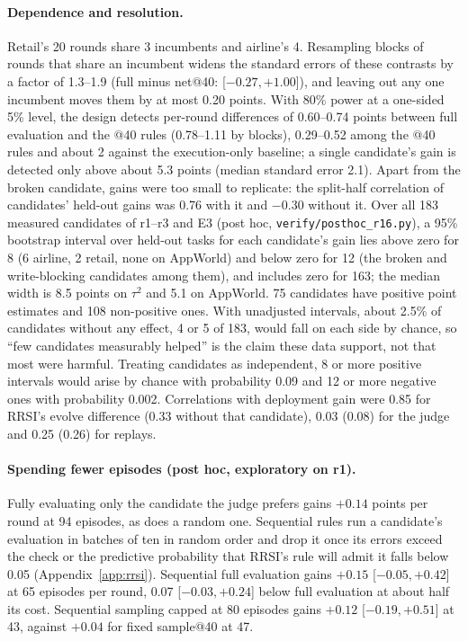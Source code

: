 \documentclass[11pt]{article}
\begin{document}
\paragraph{Dependence and resolution.} Retail's 20 rounds share 3 incumbents and airline's 4. Resampling blocks of rounds that share an incumbent widens the standard errors of these contrasts by a factor of 1.3--1.9 (full minus net@40: [$-0.27,+1.00$]), and leaving out any one incumbent moves them by at most 0.20 points. With 80\% power at a one-sided 5\% level, the design detects per-round differences of 0.60--0.74 points between full evaluation and the @40 rules (0.78--1.11 by blocks), 0.29--0.52 among the @40 rules and about 2 against the execution-only baseline; a single candidate's gain is detected only above about 5.3 points (median standard error 2.1). Apart from the broken candidate, gains were too small to replicate: the split-half correlation of candidates' held-out gains was 0.76 with it and $-0.30$ without it. Over all 183 measured candidates of r1--r3 and E3 (post hoc, \texttt{verify/posthoc\_r16.py}), a 95\% bootstrap interval over held-out tasks for each candidate's gain lies above zero for 8 (6 airline, 2 retail, none on AppWorld) and below zero for 12 (the broken and write-blocking candidates among them), and includes zero for 163; the median width is 8.5 points on $\tau^2$ and 5.1 on AppWorld. 75 candidates have positive point estimates and 108 non-positive ones. With unadjusted intervals, about 2.5\% of candidates without any effect, 4 or 5 of 183, would fall on each side by chance, so ``few candidates measurably helped'' is the claim these data support, not that most were harmful. Treating candidates as independent, 8 or more positive intervals would arise by chance with probability 0.09 and 12 or more negative ones with probability 0.002. Correlations with deployment gain were 0.85 for RRSI's evolve difference (0.33 without that candidate), 0.03 (0.08) for the judge and 0.25 (0.26) for replays.

\paragraph{Spending fewer episodes (post hoc, exploratory on r1).} Fully evaluating only the candidate the judge prefers gains $+0.14$ points per round at 94 episodes, as does a random one. Sequential rules run a candidate's evaluation in batches of ten in random order and drop it once its errors exceed the check or the predictive probability that RRSI's rule will admit it falls below 0.05 (Appendix~\ref{app:rrsi}). Sequential full evaluation gains $+0.15$ [$-0.05,+0.42$] at 65 episodes per round, 0.07 [$-0.03,+0.24$] below full evaluation at about half its cost. Sequential sampling capped at 80 episodes gains $+0.12$ [$-0.19,+0.51$] at 43, against $+0.04$ for fixed sample@40 at 47.
\end{document}
